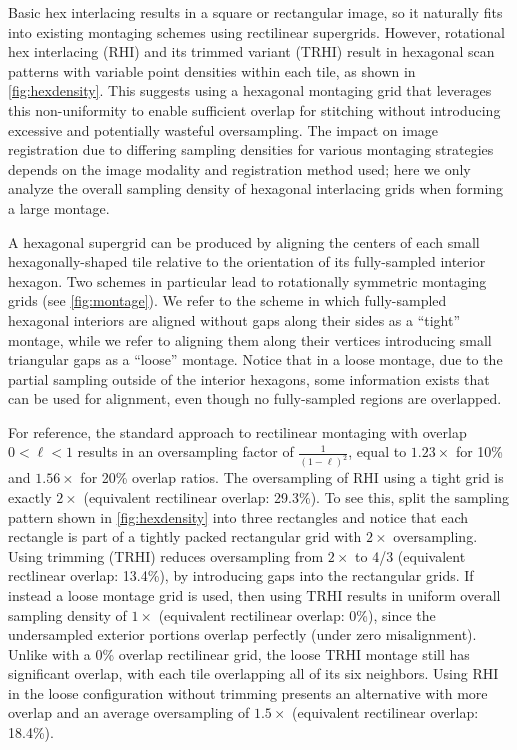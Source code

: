 \documentclass[aip, amsmath, amssymb, nobibnotes, nofootinbib, citeautoscript, reprint, superscriptaddress]{revtex4-1}
\begin{document}
    Basic hex interlacing results in a square or rectangular image, so it naturally fits into existing montaging schemes using rectilinear supergrids.
    However, rotational hex interlacing (RHI) and its trimmed variant (TRHI) result in hexagonal scan patterns with variable point densities within each tile, as shown in \autoref{fig:hexdensity}.
    This suggests using a hexagonal montaging grid that leverages this non-uniformity to enable sufficient overlap for stitching without introducing excessive and potentially wasteful oversampling.
    The impact on image registration due to differing sampling densities for various montaging strategies depends on the image modality and registration method used; here we only analyze the overall sampling density of hexagonal interlacing grids when forming a large montage.


    A hexagonal supergrid can be produced by aligning the centers of each small hexagonally-shaped tile relative to the orientation of its fully-sampled interior hexagon.
    Two schemes in particular lead to rotationally symmetric montaging grids (see \autoref{fig:montage}).
    We refer to the scheme in which fully-sampled hexagonal interiors are aligned without gaps along their sides as a ``tight'' montage, while we refer to aligning them along their vertices introducing small triangular gaps as a ``loose'' montage.
    Notice that in a loose montage, due to the partial sampling outside of the interior hexagons, some information exists that can be used for alignment, even though no fully-sampled regions are overlapped.


    For reference, the standard approach to rectilinear montaging with overlap $\mathrm{0<\ell<1}$ results in an oversampling factor of $\mathrm{\frac{1}{(1-\ell)^2}}$, equal to $\mathrm{1.23\times}$ for 10\% and $\mathrm{1.56\times}$ for 20\% overlap ratios.
    The oversampling of RHI using a tight grid is exactly $2\times$ (equivalent rectilinear overlap: 29.3\%).
    To see this, split the sampling pattern shown in \autoref{fig:hexdensity} into three rectangles and notice that each rectangle is part of a tightly packed rectangular grid with $\mathrm{2\times}$ oversampling.
    Using trimming (TRHI) reduces oversampling from $2\times$ to 4/3 (equivalent rectlinear overlap: 13.4\%), by introducing gaps into the rectangular grids.
    If instead a loose montage grid is used, then using TRHI results in uniform overall sampling density of $1\times$ (equivalent rectilinear overlap: 0\%), since the undersampled exterior portions overlap perfectly (under zero misalignment).
    Unlike with a 0\% overlap rectilinear grid, the loose TRHI montage still has significant overlap, with each tile overlapping all of its six neighbors.
    Using RHI in the loose configuration without trimming presents an alternative with more overlap and an average oversampling of $\mathrm{1.5\times}$ (equivalent rectilinear overlap: 18.4\%).
\end{document}

